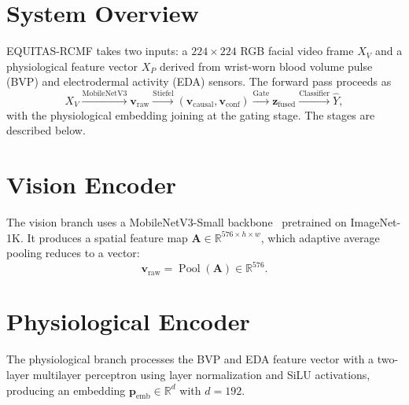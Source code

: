 \section{System Overview}
EQUITAS-RCMF takes two inputs: a $224 \times 224$ RGB facial video frame $X_V$ and a physiological feature vector $X_P$ derived from wrist-worn blood volume pulse (BVP) and electrodermal activity (EDA) sensors. The forward pass proceeds as
\begin{equation}
X_V \xrightarrow{\text{MobileNetV3}} \mathbf{v}_{\text{raw}}
\xrightarrow{\text{Stiefel}} (\mathbf{v}_{\text{causal}}, \mathbf{v}_{\text{conf}})
\xrightarrow{\text{Gate}} \mathbf{z}_{\text{fused}}
\xrightarrow{\text{Classifier}} \hat{Y},
\end{equation}
with the physiological embedding joining at the gating stage. The stages are described below.

\section{Vision Encoder}
The vision branch uses a MobileNetV3-Small backbone~\cite{howard2019} pretrained on ImageNet-1K. It produces a spatial feature map $\mathbf{A} \in \mathbb{R}^{576 \times h \times w}$, which adaptive average pooling reduces to a vector:
\begin{equation}
\mathbf{v}_{\text{raw}} = \operatorname{Pool}(\mathbf{A}) \in \mathbb{R}^{576}.
\end{equation}

\section{Physiological Encoder}
The physiological branch processes the BVP and EDA feature vector with a two-layer multilayer perceptron using layer normalization and SiLU activations, producing an embedding $\mathbf{p}_{\text{emb}} \in \mathbb{R}^{d}$ with $d = 192$.

